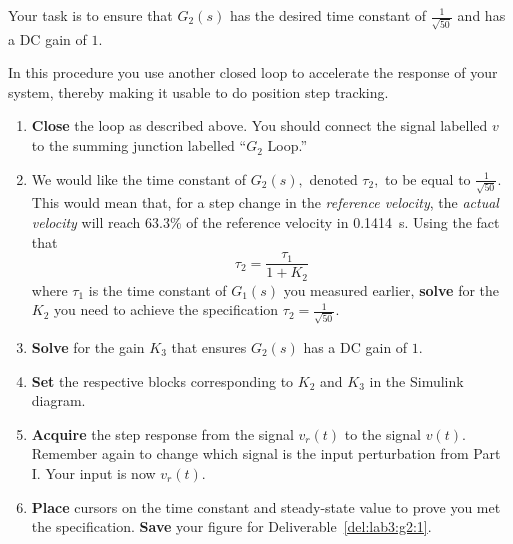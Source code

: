Your task is to ensure that \(G_2(s)\) has the desired time constant of \(\frac{1}{\sqrt{50}}\) and has a DC gain of \(1.\)
%
\begin{procedure}[label={proc:lab3:speedup}]
  In this procedure you use another closed loop to accelerate the response of your system, thereby making it usable to do position step tracking.
  \begin{enumerate}[label={(\arabic*)}]
    \item{%
      \textbf{Close} the loop as described above.
      You should connect the signal labelled \(v\) to the summing junction labelled ``\(G_2\) Loop.''%
    }
    \item{%
      We would like the time constant of \(G_2(s),\) denoted \(\tau_2,\) to be equal to \(\frac{1}{\sqrt{50}}.\)
      This would mean that, for a step change in the \emph{reference velocity}, the \emph{actual velocity} will reach \(63.3\%\) of the reference velocity in \SI{0.1414}{s}.
      Using the fact that
      \[
        \tau_2 = \frac{\tau_1}{1 + K_2}
      \]
      where \(\tau_1\) is the time constant of \(G_1(s)\) you measured earlier, \textbf{solve} for the \(K_2\) you need to achieve the specification \(\tau_2 = \frac{1}{\sqrt{50}}.\)%
    }
    \item{%
      \textbf{Solve} for the gain \(K_3\) that ensures \(G_2(s)\) has a DC gain of \(1.\)%
    }
    \item{%
      \textbf{Set} the respective blocks corresponding to \(K_2\) and \(K_3\) in the Simulink diagram.%
    }
    \item{%
      \textbf{Acquire} the step response from the signal \(v_r(t)\) to the signal \(v(t).\)
      Remember again to change which signal is the input perturbation from Part I.
      Your input is now \(v_r(t).\)%
    }
    \item{%
      \textbf{Place} cursors on the time constant and steady-state value to prove you met the specification.
      \textbf{Save} your figure for Deliverable~\ref{del:lab3:g2:1}.%
    }
  \end{enumerate}
\end{procedure}


